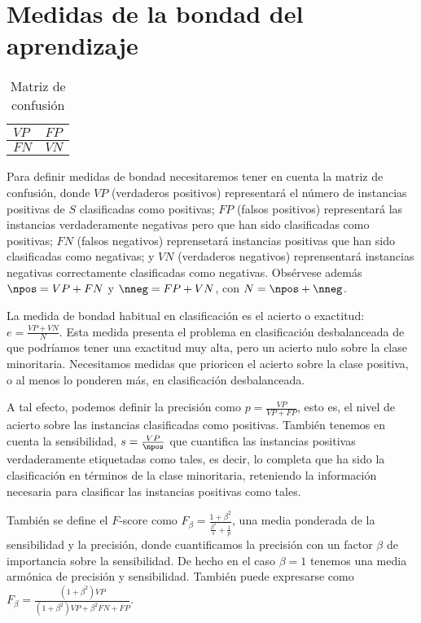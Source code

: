 \section{Medidas de la bondad del aprendizaje}

\begin{table}[H]
  \centering
  \begin{tabular}{C{3cm}|C{3cm}}
  $VP$ & $FP$\\
  \hline
  $FN$ & $VN$\\
  \end{tabular}
  \caption{Matriz de confusión}
\end{table}

Para definir medidas de bondad necesitaremos tener en cuenta la matriz de confusión, donde $VP$ (verdaderos positivos) 
representará el número de instancias positivas de $S$ clasificadas como positivas; $FP$ (falsos positivos) representará las instancias
verdaderamente negativas pero que han sido clasificadas como positivas; $FN$ (falsos negativos) reprensetará instancias 
positivas que han sido clasificadas como negativas; y $VN$ (verdaderos negativos) reprensentará instancias negativas
correctamente clasificadas como negativas. Obsérvese además $\npos = VP + FN$ y $\nneg = FP + VN$, con $N = \npos + \nneg$.

La medida de bondad habitual en clasificación es el acierto o exactitud: $e = \frac{VP + VN}{N}$. Esta medida presenta el
problema en clasificación desbalanceada de que podríamos tener una exactitud muy alta, pero un acierto nulo sobre la clase 
minoritaria. Necesitamos medidas que prioricen el acierto sobre la clase positiva, o al menos lo ponderen 
más, en clasificación desbalanceada.

A tal efecto, podemos definir la precisión como $p = \frac{VP}{VP + FP}$, esto es, el nivel de acierto sobre las instancias 
clasificadas como positivas. También tenemos en cuenta la sensibilidad, $s = \frac{VP}{\npos}$ que cuantifica las instancias
positivas verdaderamente etiquetadas como tales, es decir, lo completa que ha sido la clasificación en términos de la clase
minoritaria, reteniendo la información necesaria para clasificar las instancias positivas como tales.

También se define el $F$-score como $F_{\beta} = \frac{1 + \beta^2}{\frac{\beta^2}{s} + \frac{1}{p}}$, una media 
ponderada de la sensibilidad y la precisión, donde cuantificamos la precisión con un factor $\beta$ de importancia sobre 
la sensibilidad. De hecho en el caso $\beta = 1$ tenemos una media armónica de precisión y sensibilidad. También puede 
expresarse como $F_{\beta} = \frac{(1+\beta^2) VP}{(1+\beta^2) VP + \beta^2 FN + FP}$.

